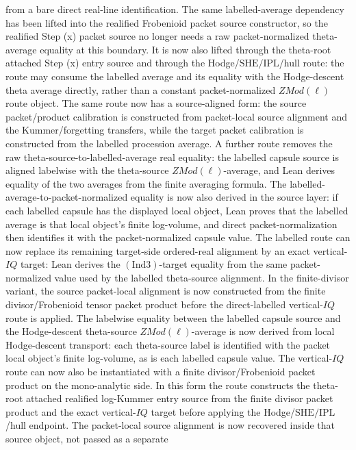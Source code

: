 \documentclass[11pt]{article}
\newcommand{\Lean}{Lean}
\newcommand{\Ind}{\ensuremath{\mathrm{Ind}}}
\newcommand{\SHE}{\ensuremath{\mathrm{SHE}}}
\newcommand{\IPL}{\ensuremath{\mathrm{IPL}}}
\theoremstyle{plain}
\theoremstyle{definition}
\theoremstyle{remark}
\begin{document}
from a bare direct real-line identification.
The same labelled-average dependency has been lifted into the realified
Frobenioid packet source constructor, so the realified Step (x) packet source no
longer needs a raw packet-normalized theta-average equality at this boundary.
It is now also lifted through the theta-root attached Step (x) entry source and
through the Hodge/\(\SHE/\IPL\)/hull route: the route may consume the labelled
average and its equality with the Hodge-descent theta average directly, rather
than a constant packet-normalized \(ZMod(\ell)\) route object.
The same route now has a source-aligned form: the source packet/product
calibration is constructed from packet-local source alignment and the
Kummer/forgetting transfers, while the target packet calibration is constructed
from the labelled procession average.
A further route removes the raw theta-source-to-labelled-average real equality:
the labelled capsule source is aligned labelwise with the theta-source
\(ZMod(\ell)\)-average, and \Lean{} derives equality of the two averages from
the finite averaging formula.
The labelled-average-to-packet-normalized equality is now also derived in the
source layer: if each labelled capsule has the displayed local object, \Lean{}
proves that the labelled average is that local object's finite log-volume, and
direct packet-normalization then identifies it with the packet-normalized
capsule value.
The labelled route can now replace its remaining target-side ordered-real
alignment by an exact vertical-\(IQ\) target: \Lean{} derives the
\((\Ind3)\)-target equality from the same packet-normalized value used by the
labelled theta-source alignment.
In the finite-divisor variant, the source packet-local alignment is now
constructed from the finite divisor/Frobenioid tensor packet product before
the direct-labelled vertical-\(IQ\) route is applied.
The labelwise equality between the labelled capsule source and the
Hodge-descent theta-source \(ZMod(\ell)\)-average is now derived from local
Hodge-descent transport: each theta-source label is identified with the
packet local object's finite log-volume, as is each labelled capsule value.
The vertical-\(IQ\) route can now also be instantiated with a finite
divisor/Frobenioid packet product on the mono-analytic side.  In this form the
route constructs the theta-root attached realified log-Kummer entry source
from the finite divisor packet product and the exact vertical-\(IQ\) target
before applying the Hodge/\(\SHE/\IPL\)/hull endpoint.  The packet-local source
alignment is now recovered inside that source object, not passed as a separate
\end{document}
